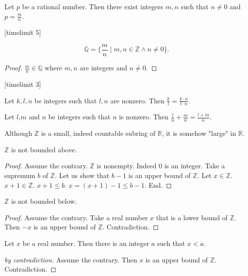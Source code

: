 \documentclass{article}
\begin{document}
\begin{forthel}

\begin{axiom} Let $p$ be a rational number. Then
there exist integers $m, n$ such that
$n \neq 0$ and $p = \frac{m}{n}$.
\end{axiom}
[timelimit 5]
\begin{lemma}
$$\mathbb{Q} = 
\{\frac{m}{n} \mid m,n \in \mathbb{Z} \wedge n \neq 0\}.$$
\end{lemma}
\begin{proof}
$\frac{m}{n} \in \mathbb{Q}$ where $m,n$ are integers and
$n \neq 0$.
\end{proof}
[timelimit 3]

\begin{lemma}
	Let $k,l,n$ be integers such that $l,n$ are nonzero.
	Then $\frac{k}{l} = \frac{k\cdot n}{l \cdot n}$. 
\end{lemma}

\begin{lemma}
	Let $l$,$m$ and $n$ be integers such that $n$ is nonzero.
	Then $\frac{l}{n} + \frac{m}{n} = \frac{l + m}{n}$.
\end{lemma}

\end{forthel}
%
Although $\mathbb{Z}$ is a small, indeed countable subring
of $\mathbb{R}$, it is somehow "large" in $\mathbb{R}$.
%
\begin{forthel}


\begin{theorem}[Archimedes1]
$\mathbb{Z}$ is not bounded above.
\end{theorem}
\begin{proof}
Assume the contrary.
$\mathbb{Z}$ is nonempty. Indeed $0$ is an integer.
Take a supremum
$b$ of $\mathbb{Z}$.
Let us show that $b - 1$ is an upper bound of $\mathbb{Z}$.
Let $x \in \mathbb{Z}$. $x + 1 \in \mathbb{Z}$.
$x + 1 \leq b$.
$x = (x + 1) - 1 \leq b - 1$.
End.
\end{proof}

\begin{theorem}
$\mathbb{Z}$ is not bounded below.
\end{theorem}
\begin{proof}
Assume the contrary.
Take a real number $x$ that is a lower bound of $\mathbb{Z}$.
Then $-x$ is an upper bound of $\mathbb{Z}$.
Contradiction.
\end{proof}

\begin{theorem}[Archimedes2]
Let $x$ be a real number.
Then there is an integer $a$
such that $x < a$.\end{theorem}
\begin{proof}[by contradiction]
Assume the contrary.
Then $x$ is an upper bound of $\mathbb{Z}$.
Contradiction.
\end{proof}


\end{forthel}
\end{document}
